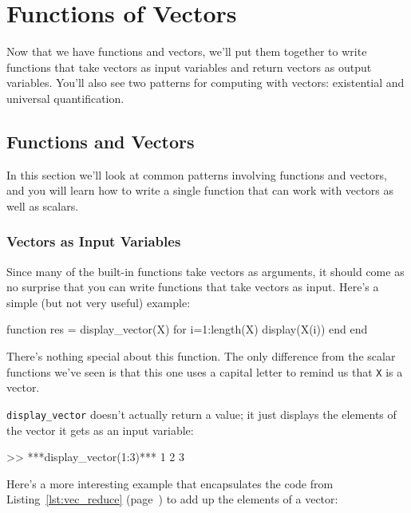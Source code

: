 \chapter{Functions of Vectors}

Now that we have functions and vectors, we'll put them together to write functions that take vectors as input variables and return vectors as output variables.  You'll also see two patterns for computing with vectors: existential and universal quantification.


\section{Functions and Vectors}

In this section we'll look at common patterns involving functions and vectors, and you will learn how to write a single function that can work with vectors as well as scalars.

\subsection{Vectors as Input Variables}

Since many of the built-in functions take vectors as arguments,
it should come as no surprise that you can write functions that
take vectors as input.  Here's a simple (but not very useful) example:


\begin{code}
function res = display_vector(X)
    for i=1:length(X)
        display(X(i))
    end
end
\end{code}

There's nothing special about this function.  The only
difference from the scalar functions we've seen is that this one uses
a capital letter to remind us that \lstinline{X} is a vector.

\lstinline{display_vector} doesn't actually return a value; it just displays the elements of the vector it gets as an input variable:

\begin{code}
>> ***display_vector(1:3)***
    1
    2
    3
\end{code}

Here's a more interesting example that encapsulates the code
from Listing~\ref{lst:vec_reduce} (page~\pageref{lst:vec_reduce}) to add up the elements of a vector:


